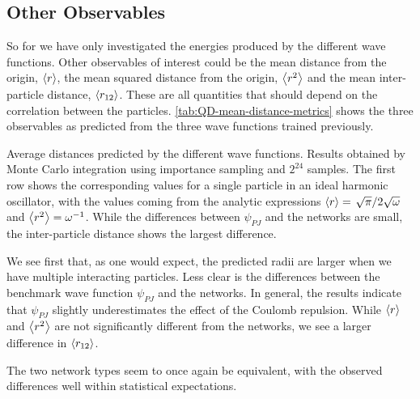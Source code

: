 \documentclass[Thesis.tex]{subfiles}
\begin{document}
\subsection{Other Observables}

So for we have only investigated the energies produced by the different wave
functions. Other observables of interest could be the mean distance from the origin,
$\expval{r}$, the mean squared distance from the origin, $\expval{r^2}$ and the mean
inter-particle distance, $\expval{r_{12}}$. These are all quantities that should
depend on the correlation between the particles.
\cref{tab:QD-mean-distance-metrics} shows the three observables as predicted
from the three wave functions trained previously. 

\begin{table}[h]
  \centering
  \caption{Average distances predicted by the different wave functions. Results
    obtained by Monte Carlo integration using importance sampling and $2^{24}$
    samples. The first row shows the corresponding values for a single particle
    in an ideal harmonic oscillator, with the values coming from the analytic
    expressions $\expval{r}=\flatfrac{\sqrt\pi}{2\sqrt\omega}$ and
    $\expval{r^2}=\omega^{-1}$. While the differences between $\psi_{PJ}$ and
    the networks are small, the inter-particle distance shows the largest
    difference.}
  
  \label{tab:QD-mean-distance-metrics}
\end{table}
We see first that, as one would expect, the predicted radii are larger when we
have multiple interacting particles. Less clear is the differences between the
benchmark wave function $\psi_{PJ}$ and the networks. In general, the results
indicate that $\psi_{PJ}$ slightly underestimates the effect of the Coulomb
repulsion. While $\expval{r}$ and $\expval{r^2}$ are not significantly different
from the networks, we see a larger difference in $\expval{r_{12}}$. 

The two network types seem to once again be equivalent, with the observed differences well
within statistical expectations.
\end{document}
